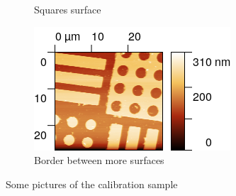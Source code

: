 \documentclass[11pt,a4paper]{article}
\begin{document}
\begin{figure}[H]
\begin{subfigure}[b]{0.45\textwidth}
\caption{Squares surface}
\label{fig:sm_squares}
\end{subfigure}
\begin{subfigure}[b]{0.45\textwidth}
\includegraphics[width=\textwidth]{sm_border}
\caption{Border between more surfaces}
\label{fig:sm_border}
\end{subfigure}
\caption{Some pictures of the calibration sample}
\label{fig:static_calibration_grid}
\end{figure}
\end{document}
